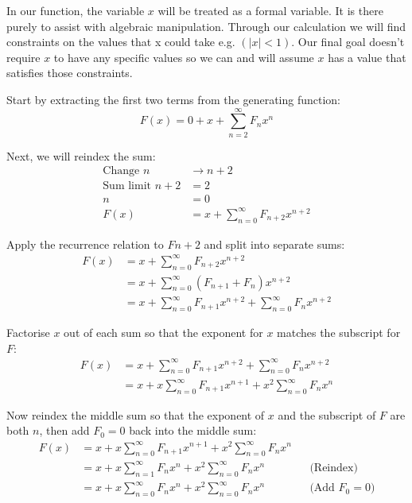 \documentclass{article}
\begin{document}
In our function, the variable \(x\) will be treated as a formal variable. It is
there purely to assist with algebraic manipulation. Through our calculation we
will find constraints on the values that x could take e.g. \((|x|<1)\). Our
final goal doesn't require \(x\) to have any specific values so we can and will
assume \(x\) has a value that satisfies those constraints.

Start by extracting the first two terms from the generating function:
\[ F(x) = 0 + x + \sum_{n=2}^\infty F_nx^n \]

Next, we will reindex the sum:
\[\begin{aligned}
    \text{Change } n &\to n+2 \\
    \text{Sum limit } n+2 &= 2 \\
    n &= 0 \\
    F(x) &= x + \sum_{n=0}^\infty F_{n+2}x^{n+2}
\end{aligned}\]

Apply the recurrence relation to \(Fn+2\) and split into separate sums:
\[\begin{aligned}
    F(x) &= x + \sum_{n=0}^\infty F_{n+2}x^{n+2} \\
    &= x + \sum_{n=0}^\infty (F_{n+1} + F_n)x^{n+2} \\
    &= x + \sum_{n=0}^\infty F_{n+1}x^{n+2}
         + \sum_{n=0}^\infty F_nx^{n+2}
\end{aligned}\]

Factorise \(x\) out of each sum so that the exponent for \(x\) matches the
subscript for \(F\):
\[\begin{aligned}
    F(x) &= x + \sum_{n=0}^\infty F_{n+1}x^{n+2}
              + \sum_{n=0}^\infty F_nx^{n+2} \\
    &= x + x\sum_{n=0}^\infty F_{n+1}x^{n+1} + x^2\sum_{n=0}^\infty F_nx^n
\end{aligned}\]

Now reindex the middle sum so that the exponent of \(x\) and the subscript of
\(F\) are both \(n\), then add \(F_0=0\) back into the middle sum:
\[\begin{aligned}
    F(x) &= x + x\sum_{n=0}^\infty F_{n+1}x^{n+1}
              + x^2\sum_{n=0}^\infty F_nx^n \\
    &= x + x\sum_{n=1}^\infty F_nx^n + x^2\sum_{n=0}^\infty F_nx^n
        && \text{(Reindex)} \\
    &= x + x\sum_{n=0}^\infty F_nx^n + x^2\sum_{n=0}^\infty F_nx^n
        && \text{(Add \(F_0 = 0\))}
\end{aligned}\]
\end{document}
